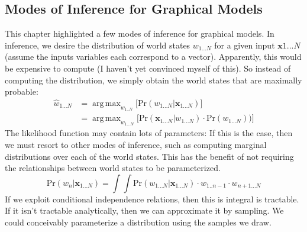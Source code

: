 \documentclass[idxtotoc,hyperref,openany]{labbook} %
\DeclareMathOperator*{\argmax}{arg\,max}
\begin{document}
\subsection*{Modes of Inference for Graphical Models}
This chapter highlighted a few modes of inference for graphical models. In inference, we desire the distribution of world states $w_{1...N}$ for a given input $\mathbf{x}{1...N}$ (assume the inputs variables each correspond to a vector). Apparently, this would be expensive to compute (I haven't yet convinced myself of this). So instead of computing the distribution, we simply obtain the world states that are maximally probable:
\begin{align*}
	\hat{w}_{1...N} &= \argmax_{w_{1..N}}\Big[\text{Pr}(w_{1...N}|\mathbf{x}_{1...N})\Big] \\
	&= \argmax_{w_{1...N}}\Big[\text{Pr}(\mathbf{x}_{1...N}|w_{1...N})\cdot\text{Pr}(w_{1...N}))\Big]
\end{align*}
The likelihood function may contain lots of parameters: If this is the case, then we must resort to other modes of inference, such as computing marginal distributions over each of the world states. This has the benefit of not requiring the relationships between world states to be parameterized.
\[
	\text{Pr}(w_n | \mathbf{x}_{1...N}) = \int\int \text{Pr}(w_{1...N}|\mathbf{x}_{1...N})\cdot w_{1..n-1} \cdot w_{n+1...N}
\]
If we exploit conditional independence relations, then this is integral is tractable. If it isn't tractable analytically, then we can approximate it by sampling. We could conceivably parameterize a distribution using the samples we draw.
\end{document}
